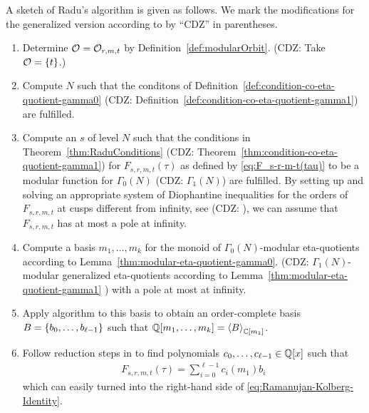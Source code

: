 \documentclass{article}
\begin{document}
A sketch of Radu's algorithm \cite{Radu_RamanujanKolberg_2015} is given as
follows. We mark the modifications for the generalized version
according to \cite{ChenDuZhao_FindingModularFunctionsRamanujan_2019}
by ``CDZ'' in parentheses.

\begin{enumerate}
\item Determine $\modularOrbit{}=\modularOrbit{r,m,t}$ by
  Definition~\ref{def:modularOrbit}.
  (CDZ: Take $\modularOrbit{}=\Set{t}$.)

\item Compute $N$ such that the conditons of
  Definition~\ref{def:condition-co-eta-quotient-gamma0}
  (CDZ: Definition~\ref{def:condition-co-eta-quotient-gamma1})
  are fulfilled.

\item Compute an  $s$ of level $N$ such
  that the conditions in Theorem~\ref{thm:RaduConditions}
  (CDZ: Theorem~\ref{thm:condition-co-eta-quotient-gamma1})
  for $F_{s,r,m,t}(\tau)$ as defined by \eqref{eq:F_s-r-m-t(tau)} to
  be a modular function for $\Gamma_0(N)$
  (CDZ: $\Gamma_1(N)$)
  are fulfilled. By setting up and solving an appropriate system of
  Diophantine inequalities for the orders of $F_{s,r,m,t}$ at cusps
  different from infinity, see
  \cite[Proposition~3.2.8]{Ligozat_CourbesModulaires_1975} (CDZ:
  \cite[Thm.~4]{Robins_GeneralizedDedekindEtaProducts_1994}), we can
  assume that $F_{s,r,m,t}$ has at most a pole at infinity.
\item Compute a basis $m_1,\ldots, m_k$ for the monoid of
  $\Gamma_0(N)$-modular eta-quotients according
  to Lemma~\ref{thm:modular-eta-quotient-gamma0}.
  (CDZ: $\Gamma_1(N)$-modular generalized eta-quotients according
  to Lemma~\ref{thm:modular-eta-quotient-gamma1} )
  with a pole at most at infinity.

\item Apply algorithm \algoSamba{}
  \cite{Hemmecke_DancingSambaRamanujan_2018} to this basis to obtain
  an order-complete basis $B=\Set{b_0,\ldots,b_{\ell-1}}$ such that
  $\setQ[m_1,\ldots,m_k] = \Module[{\setC[m_1]}]{B}$.

\item Follow reduction steps in
  \cite{Hemmecke_DancingSambaRamanujan_2018} to find polynomials
  $c_0,\ldots,c_{\ell-1} \in \setQ[x]$ such that
  \begin{gather*}
    F_{s,r,m,t}(\tau) = \sum_{i=0}^{\ell-1} c_i(m_1)b_i
  \end{gather*} which can easily turned into the right-hand side of
  \eqref{eq:Ramanujan-Kolberg-Identity}.
\end{enumerate}
\end{document}
